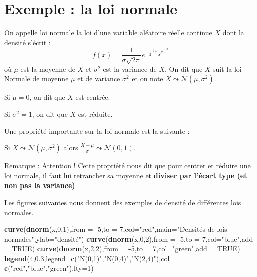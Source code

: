 \documentclass[]{book}
\newenvironment{Shaded}{\begin{snugshade}}{\end{snugshade}}
\newcommand{\KeywordTok}[1]{\textcolor[rgb]{0.13,0.29,0.53}{\textbf{{#1}}}}
\newcommand{\DataTypeTok}[1]{\textcolor[rgb]{0.13,0.29,0.53}{{#1}}}
\newcommand{\DecValTok}[1]{\textcolor[rgb]{0.00,0.00,0.81}{{#1}}}
\newcommand{\FloatTok}[1]{\textcolor[rgb]{0.00,0.00,0.81}{{#1}}}
\newcommand{\StringTok}[1]{\textcolor[rgb]{0.31,0.60,0.02}{{#1}}}
\newcommand{\OtherTok}[1]{\textcolor[rgb]{0.56,0.35,0.01}{{#1}}}
\newcommand{\NormalTok}[1]{{#1}}
\theoremstyle{definition}
\theoremstyle{definition}
\theoremstyle{remark}
\let\BeginKnitrBlock\begin \let\EndKnitrBlock\end
\begin{document}
\section{Exemple : la loi normale}\label{exemple-la-loi-normale}

On appelle loi normale la loi d'une variable aléatoire réelle continue
\(X\) dont la densité s'écrit :
\[f(x)=\frac{1}{\sigma\sqrt{2\pi}}e^{-\displaystyle\frac{1}{2}\frac{(x-\mu)^2}{\sigma^2}}\]
où \(\mu\) est la moyenne de \(X\) et \(\sigma^2\) est la variance de
\(X\). On dit que \(X\) suit la loi Normale de moyenne \(\mu\) et de
variance \(\sigma^2\) et on note \(X\leadsto \mathcal N(\mu,\sigma^2)\).

Si \(\mu=0\), on dit que \(X\) est centrée.

Si \(\sigma^2=1\), on dit que \(X\) est réduite.

Une propriété importante sur la loi normale est la suivante :

\BeginKnitrBlock{theorem}
\protect\hypertarget{thm:unnamed-chunk-1}{}{\label{thm:unnamed-chunk-1}}Si
\(X\leadsto \mathcal N(\mu,\sigma^2)\) alors
\(\displaystyle \frac{X-\mu}{\sigma} \leadsto \mathcal N(0,1)\).
\EndKnitrBlock{theorem}

Remarque : Attention ! Cette propriété nous dit que pour centrer et
réduire une loi normale, il faut lui retrancher sa moyenne et
\textbf{diviser par l'écart type (et non pas la variance)}.

Les figures suivantes nous donnent des exemples de densité de
différentes lois normales.

\begin{Shaded}
\begin{Highlighting}[]
\KeywordTok{curve}\NormalTok{(}\KeywordTok{dnorm}\NormalTok{(x,}\DecValTok{0}\NormalTok{,}\DecValTok{1}\NormalTok{),}\DataTypeTok{from =} \NormalTok{-}\DecValTok{5}\NormalTok{,}\DataTypeTok{to =} \DecValTok{7}\NormalTok{,}\DataTypeTok{col=}\StringTok{"red"}\NormalTok{,}\DataTypeTok{main=}\StringTok{"Densités de lois normales"}\NormalTok{,}\DataTypeTok{ylab=}\StringTok{"densité"}\NormalTok{)}
\KeywordTok{curve}\NormalTok{(}\KeywordTok{dnorm}\NormalTok{(x,}\DecValTok{0}\NormalTok{,}\DecValTok{2}\NormalTok{),}\DataTypeTok{from =} \NormalTok{-}\DecValTok{5}\NormalTok{,}\DataTypeTok{to =} \DecValTok{7}\NormalTok{,}\DataTypeTok{col=}\StringTok{"blue"}\NormalTok{,}\DataTypeTok{add =} \OtherTok{TRUE}\NormalTok{)}
\KeywordTok{curve}\NormalTok{(}\KeywordTok{dnorm}\NormalTok{(x,}\DecValTok{2}\NormalTok{,}\DecValTok{2}\NormalTok{),}\DataTypeTok{from =} \NormalTok{-}\DecValTok{5}\NormalTok{,}\DataTypeTok{to =} \DecValTok{7}\NormalTok{,}\DataTypeTok{col=}\StringTok{"green"}\NormalTok{,}\DataTypeTok{add =} \OtherTok{TRUE}\NormalTok{)}
\KeywordTok{legend}\NormalTok{(}\DecValTok{4}\NormalTok{,}\FloatTok{0.3}\NormalTok{,}\DataTypeTok{legend=}\KeywordTok{c}\NormalTok{(}\StringTok{"N(0,1)"}\NormalTok{,}\StringTok{"N(0,4)"}\NormalTok{,}\StringTok{"N(2,4)"}\NormalTok{),}\DataTypeTok{col =} \KeywordTok{c}\NormalTok{(}\StringTok{"red"}\NormalTok{,}\StringTok{"blue"}\NormalTok{,}\StringTok{"green"}\NormalTok{),}\DataTypeTok{lty=}\DecValTok{1}\NormalTok{)}
\end{Highlighting}
\end{Shaded}
\end{document}
